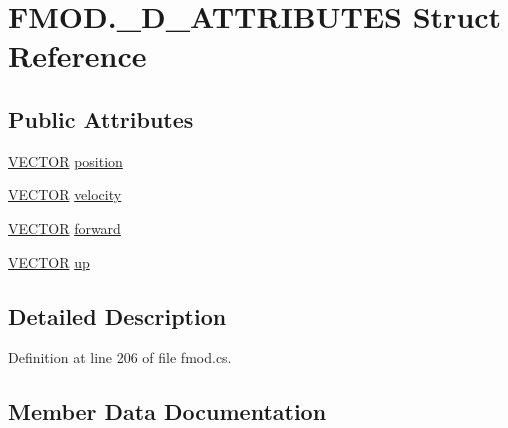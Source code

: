 \hypertarget{struct_f_m_o_d_1_1__3_d___a_t_t_r_i_b_u_t_e_s}{}\section{F\+M\+O\+D.\+\_\+D\+\_\+\+A\+T\+T\+R\+I\+B\+U\+T\+ES Struct Reference}
\label{struct_f_m_o_d_1_1__3_d___a_t_t_r_i_b_u_t_e_s}
\subsection*{Public Attributes}
\begin{DoxyCompactItemize}
\item 
\hyperlink{struct_f_m_o_d_1_1_v_e_c_t_o_r}{V\+E\+C\+T\+OR} \hyperlink{struct_f_m_o_d_1_1__3_d___a_t_t_r_i_b_u_t_e_s_a1a8dee8f2220a3460686992d5bb39137}{position}
\item 
\hyperlink{struct_f_m_o_d_1_1_v_e_c_t_o_r}{V\+E\+C\+T\+OR} \hyperlink{struct_f_m_o_d_1_1__3_d___a_t_t_r_i_b_u_t_e_s_a5ed06dd8185d2b8567368c89e499eddf}{velocity}
\item 
\hyperlink{struct_f_m_o_d_1_1_v_e_c_t_o_r}{V\+E\+C\+T\+OR} \hyperlink{struct_f_m_o_d_1_1__3_d___a_t_t_r_i_b_u_t_e_s_af21741080a9635c55640c7105cf2dbe0}{forward}
\item 
\hyperlink{struct_f_m_o_d_1_1_v_e_c_t_o_r}{V\+E\+C\+T\+OR} \hyperlink{struct_f_m_o_d_1_1__3_d___a_t_t_r_i_b_u_t_e_s_ac3b3240bbbd3c9b19848494d1b794cc9}{up}
\end{DoxyCompactItemize}


\subsection{Detailed Description}


Definition at line 206 of file fmod.\+cs.



\subsection{Member Data Documentation}
\mbox{\label{struct_f_m_o_d_1_1__3_d___a_t_t_r_i_b_u_t_e_s_af21741080a9635c55640c7105cf2dbe0}} 
